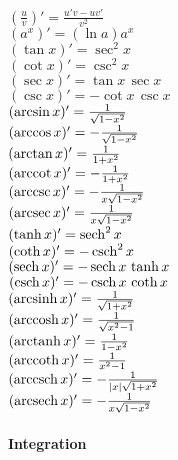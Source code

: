 \def\arccot{\mathop{\rm arccot}\nolimits}
\def\arcsec{\mathop{\rm arcsec}\nolimits}
\def\arccsc{\mathop{\rm arccsc}\nolimits}
\def\arcsinh{\mathop{\rm arcsinh}\nolimits}
\def\arccosh{\mathop{\rm arccosh}\nolimits}
\def\arctanh{\mathop{\rm arctanh}\nolimits}
\def\arccoth{\mathop{\rm arccoth}\nolimits}
\def\arcsech{\mathop{\rm arcsech}\nolimits}
\def\arccsch{\mathop{\rm arccsch}\nolimits}
\begin{flushleft}
\begin{multicols}{2}
	$ (\frac{u}{v})' = \frac{u'v - uv'}{v^2} $ \\
	$ (a^x)' = (\ln a) a^x $ \\
	$ (\tan x)' = \sec^2 x $ \\
	$ (\cot x)' = \csc^2 x $ \\
	$ (\sec x)' = \tan x\, \sec x $ \\
	$ (\csc x)' = - \cot x\, \csc x $ \\
	$ (\arcsin x)' = {1 \over \sqrt{1-x^2}} $ \\
	$ (\arccos x)' = -{1 \over \sqrt{1-x^2}} $ \\
	$ (\arctan x)' = {1 \over 1+x^2} $ \\
	$ (\arccot x)' = -{1 \over 1+x^2} $ \\
	$ (\arccsc x)' = -{1 \over x \sqrt{1-x^2}} $ \\
	$ (\arcsec x)' = {1 \over x \sqrt{1-x^2}} $ \\
	$ (\mathop{\rm tanh}\nolimits x)' = \mathop{\rm sech}\nolimits^2 x $ \\
	$ (\mathop{\rm coth}\nolimits x)' = -\mathop{\rm csch}\nolimits^2 x $ \\
	$ (\mathop{\rm sech}\nolimits x)' = -\mathop{\rm sech}\nolimits x \, \mathop{\rm tanh}\nolimits x $ \\
	$ (\mathop{\rm csch}\nolimits x)' = -\mathop{\rm csch}\nolimits x \, \mathop{\rm coth}\nolimits x $ \\
	$ (\arcsinh x)' = {1 \over \sqrt{1+x^2}} $ \\
	$ (\arccosh x)' = {1 \over \sqrt{x^2-1}} $ \\
	$ (\arctanh x)' = {1 \over 1-x^2} $ \\
	$ (\arccoth x)' = {1 \over x^2-1} $ \\
	$ (\arccsch x)' = -{1 \over \vert x \vert \sqrt{1+x^2}} $ \\
	$ (\arcsech x)' = -{1 \over x \sqrt{1-x^2}} $ \\
\end{multicols}
\end{flushleft}

\newcommand{\md}{\mathrm{d}}
\newcommand{\me}{\mathrm{e}}

\paragraph{Integration}

